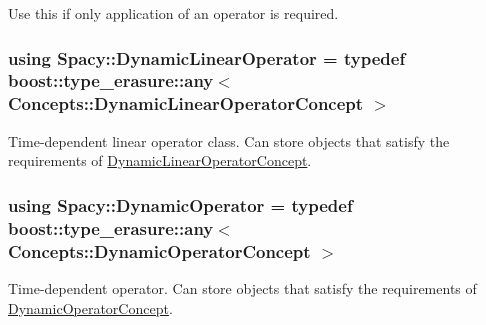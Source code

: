 \label{group__SpacyGroup_ga750d55072f7a3a16a1263961147333c0_DynamicCallableOperatorAnchor}%
\hypertarget{group__SpacyGroup_ga750d55072f7a3a16a1263961147333c0_DynamicCallableOperatorAnchor}{}%
Use this if only application of an operator is required. \hypertarget{group__SpacyGroup_gaad10aa7d5443703377b768fa41a3c7ea_gaad10aa7d5443703377b768fa41a3c7ea}{}
\subsubsection[{Dynamic\+Linear\+Operator}]{\setlength{\rightskip}{0pt plus 5cm}using {\bf Spacy\+::\+Dynamic\+Linear\+Operator} = typedef boost\+::type\+\_\+erasure\+::any$<$ {\bf Concepts\+::\+Dynamic\+Linear\+Operator\+Concept} $>$}\label{group__SpacyGroup_gaad10aa7d5443703377b768fa41a3c7ea_gaad10aa7d5443703377b768fa41a3c7ea}


Time-\/dependent linear operator class. Can store objects that satisfy the requirements of \hyperlink{group__ConceptGroup_ga015b0d099011a2ef73a16aa9b36a7346_DynamicLinearOperatorConceptAnchor}{Dynamic\+Linear\+Operator\+Concept}. 

\label{group__SpacyGroup_gaad10aa7d5443703377b768fa41a3c7ea_DynamicLinearOperatorAnchor}%
\hypertarget{group__SpacyGroup_gaad10aa7d5443703377b768fa41a3c7ea_DynamicLinearOperatorAnchor}{}%
\hypertarget{group__SpacyGroup_ga8e692134dfe46346d5692acfd1a9bd8e_ga8e692134dfe46346d5692acfd1a9bd8e}{}
\subsubsection[{Dynamic\+Operator}]{\setlength{\rightskip}{0pt plus 5cm}using {\bf Spacy\+::\+Dynamic\+Operator} = typedef boost\+::type\+\_\+erasure\+::any$<$ {\bf Concepts\+::\+Dynamic\+Operator\+Concept} $>$}\label{group__SpacyGroup_ga8e692134dfe46346d5692acfd1a9bd8e_ga8e692134dfe46346d5692acfd1a9bd8e}


Time-\/dependent operator. Can store objects that satisfy the requirements of \hyperlink{group__ConceptGroup_ga2c979d268f0ca7a436776a9631d10af7_DynamicOperatorConceptAnchor}{Dynamic\+Operator\+Concept}. 

\label{group__SpacyGroup_ga8e692134dfe46346d5692acfd1a9bd8e_DynamicOperatorAnchor}%
\hypertarget{group__SpacyGroup_ga8e692134dfe46346d5692acfd1a9bd8e_DynamicOperatorAnchor}{}%
\hypertarget{group__SpacyGroup_ga673218f603c93790864aef12c89d3a35_ga673218f603c93790864aef12c89d3a35}{}

